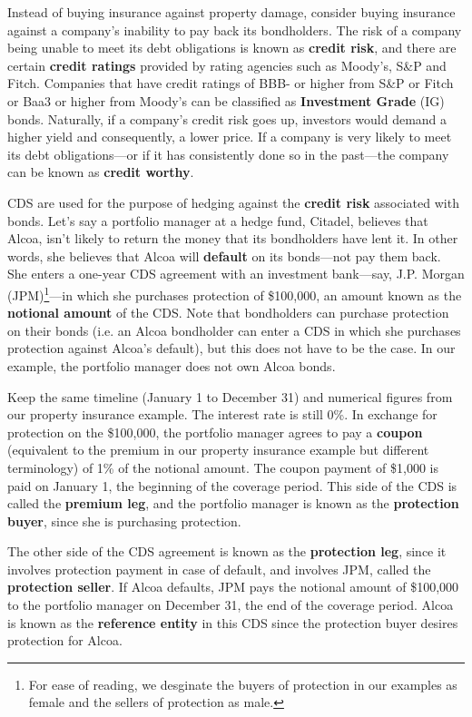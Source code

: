\documentclass{jss}
\begin{document}
Instead of buying insurance against property damage, consider buying insurance against a company's inability to pay back its bondholders. The risk of a company being unable to meet its debt obligations is known as \textbf{credit risk}, and there are certain \textbf{credit ratings} provided by rating agencies such as Moody's, S\&P and Fitch. Companies that have credit ratings of BBB- or higher from S\&P or Fitch or Baa3 or higher from Moody's can be classified as \textbf{Investment Grade} (IG) bonds. Naturally, if a company's credit risk goes up, investors would demand a higher yield and consequently, a lower price. If a company is very likely to meet its debt obligations---or if it has consistently done so in the past---the company can be known as \textbf{credit worthy}.

CDS are used for the purpose of hedging against the \textbf{credit risk} associated with bonds. Let's say a portfolio manager at a hedge fund, Citadel, believes that Alcoa, isn't likely to return the money that its bondholders have lent it. In other words, she believes that Alcoa will \textbf{default} on its bonds---not pay them back. She enters a one-year CDS agreement with an investment bank---say, J.P. Morgan (JPM)\footnote{For ease of reading, we desginate the buyers of protection in our examples as female and the sellers of protection as male.}---in which she purchases protection of \$100,000, an amount known as the \textbf{notional amount} of the CDS. Note that bondholders can purchase protection on their bonds (i.e. an Alcoa bondholder can enter a CDS in which she purchases protection against Alcoa's default), but this does not have to be the case. In our example, the portfolio manager does not own Alcoa bonds. 

Keep the same timeline (January 1 to December 31) and numerical figures from our property insurance example. The interest rate is still 0\%. In exchange for protection on the \$100,000, the portfolio manager agrees to pay a \textbf{coupon} (equivalent to the premium in our property insurance example but different terminology) of 1\% of the notional amount. The coupon payment of \$1,000 is paid on January 1, the beginning of the coverage period. This side of the CDS is called the \textbf{premium leg}, and the portfolio manager is known as the \textbf{protection buyer}, since she is purchasing protection.

The other side of the CDS agreement is known as the \textbf{protection leg}, since it involves protection payment in case of default, and involves JPM, called the \textbf{protection seller}. If Alcoa defaults, JPM pays the notional amount of \$100,000 to the portfolio manager on December 31, the end of the coverage period. Alcoa is known as the \textbf{reference entity} in this CDS since the protection buyer desires protection for Alcoa. 
\end{document}
